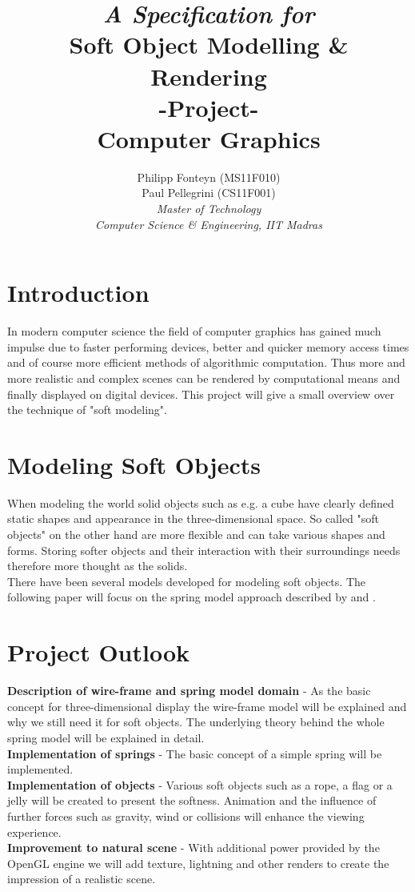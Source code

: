 \documentclass[11pt]{article}
\title{
	\emph{A Specification for}\\
	\huge{\textbf{Soft Object Modelling \& Rendering} }\\
	-Project-\\
	Computer Graphics\\[2em]	
}
\author{
	Philipp Fonteyn (MS11F010)\\
	Paul Pellegrini (CS11F001)\\[2em]
	\emph{Master of Technology}\\
	\emph{Computer Science \& Engineering, IIT Madras}
}
\begin{document}
\maketitle
\newpage

%
%
%
\section{Introduction}
In modern computer science the field of computer graphics has gained much impulse due to faster performing devices, better and quicker memory access times and of course more efficient methods of algorithmic computation. Thus more and more realistic and complex scenes can be rendered by computational means and finally displayed on digital devices. This project will give a small overview over the technique of "soft modeling".
%
%
%
\section{Modeling Soft Objects}
When modeling the world solid objects such as e.g. a cube have clearly defined static shapes and appearance in the three-dimensional space. So called "soft objects" on the other hand are more flexible and can take various shapes and forms. Storing softer objects and their interaction with their surroundings needs therefore more thought as the solids.\\[1em]
%
There have been several models developed for modeling soft objects. The following paper will focus on the spring model approach described by \cite{LSCS} and \cite{hair}\cite{gama}.

%
%
%
\section{Project Outlook}
%
\textbf{Description of wire-frame and spring model domain} - As the basic concept for three-dimensional display the wire-frame model will be explained and why we still need it for soft objects. The underlying theory behind the whole spring model will be explained in detail.\\[1em]
%
\textbf{Implementation of springs} - The basic concept of a simple spring will be implemented.\\[1em]
%
\textbf{Implementation of objects} - Various soft objects such as a rope, a flag or a jelly will be created to present the softness. Animation and the influence of further forces such as gravity, wind or collisions will enhance the viewing experience.\\[1em]
%
\textbf{Improvement to natural scene} - With additional power provided by the OpenGL engine \cite{opengl} we will add texture, lightning and other renders to create the impression of a realistic scene.
%
\end{document}
